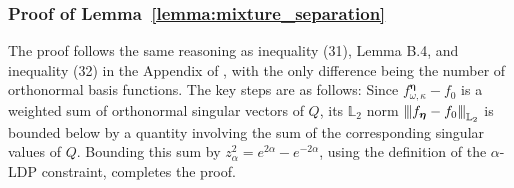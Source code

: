 \documentclass[twoside,11pt]{article}
\newcommand{\Ell}{\mathbb{L}}
\newcommand{\EllTwo}{\Ell_2} %
\newcommand{\vertiii}[1]{
	{\left\vert\kern-0.25ex\left\vert\kern-0.25ex\left\vert #1 
		\right\vert\kern-0.25ex\right\vert\kern-0.25ex\right\vert}
}%
\newcommand{\privacyMechanism}{Q}
\newcommand{\privacyParameter}{\alpha} %
\newcommand{\binNum}{\kappa}           %
\begin{document}
\begin{appendix}
	\subsubsection{Proof of Lemma~\ref{lemma:mixture_separation}}\label{proof:mixture_separation}
	The proof follows the same reasoning as inequality (31), Lemma B.4, and inequality (32) in the Appendix of \citet{Lam-Weil2021MinimaxConstraint}, with the only difference being the number of orthonormal basis functions. The key steps are as follows: Since \( f^{{\boldsymbol{\eta}}}_{\omega, \binNum} - f_0 \) is a weighted sum of orthonormal singular vectors of \(\privacyMechanism\), its \(\EllTwo\) norm \( \vertiii{f_{{\boldsymbol{\eta}}} - f_0}_{\EllTwo} \) is bounded below by a quantity involving the sum of the corresponding singular values of \(\privacyMechanism\). Bounding this sum  by \( z_\privacyParameter^2 = e^{2\alpha} - e^{-2\alpha} \), using the definition of the \(\privacyParameter\)-LDP constraint, completes the proof.

\end{appendix}
\end{document}
